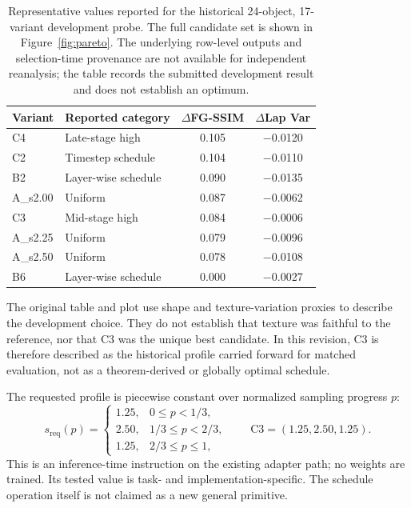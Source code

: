 \documentclass[11pt]{article}
\begin{document}
\begin{table}[t]
\centering
\caption{Representative values reported for the historical 24-object, 17-variant development probe. The full candidate set is shown in Figure~\ref{fig:pareto}. The underlying row-level outputs and selection-time provenance are not available for independent reanalysis; the table records the submitted development result and does not establish an optimum.}
\label{tab:probe}
\footnotesize\setlength{\tabcolsep}{3pt}
\begin{tabular}{llcc}
\toprule
Variant & Reported category & $\Delta$FG-SSIM & $\Delta$Lap Var \\
\midrule
C4 & Late-stage high & 0.105 & $-$0.0120 \\
C2 & Timestep schedule & 0.104 & $-$0.0110 \\
B2 & Layer-wise schedule & 0.090 & $-$0.0135 \\
A\_s2.00 & Uniform & 0.087 & $-$0.0062 \\
C3 & Mid-stage high & 0.084 & $-$0.0006 \\
A\_s2.25 & Uniform & 0.079 & $-$0.0096 \\
A\_s2.50 & Uniform & 0.078 & $-$0.0108 \\
B6 & Layer-wise schedule & 0.000 & $-$0.0027 \\
\bottomrule
\end{tabular}
\end{table}

The original table and plot use shape and texture-variation proxies to describe the development choice. They do not establish that texture was faithful to the reference, nor that C3 was the unique best candidate. In this revision, C3 is therefore described as the historical profile carried forward for matched evaluation, not as a theorem-derived or globally optimal schedule.

The requested profile is piecewise constant over normalized sampling progress $p$:
\begin{equation}
s_{\mathrm{req}}(p) =
\begin{cases}
1.25, & 0 \le p < 1/3,\\
2.50, & 1/3 \le p < 2/3,\\
1.25, & 2/3 \le p \le 1,
\end{cases}
\qquad \mathrm{C3}=(1.25,2.50,1.25).
\end{equation}
This is an inference-time instruction on the existing adapter path; no weights are trained. Its tested value is task- and implementation-specific. The schedule operation itself is not claimed as a new general primitive.
\end{document}
